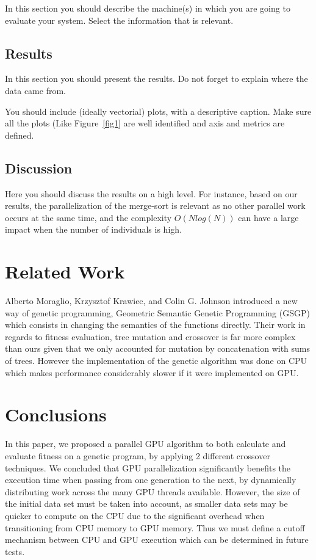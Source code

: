\documentclass[runningheads]{llncs}
\begin{document}
In this section you should describe the machine(s) in which you are going to evaluate your system. Select the information that is relevant.


\subsection{Results}

In this section you should present the results. Do not forget to explain where the data came from. 

You should include (ideally vectorial) plots, with a descriptive caption. Make sure all the plots (Like Figure~\ref{fig1} are well identified and axis and metrics are defined.

\subsection{Discussion}

Here you should discuss the results on a high level. For instance, based on our results, the parallelization of the merge-sort is relevant as no other parallel work occurs at the same time, and the complexity $O(Nlog(N))$ can have a large impact when the number of individuals is high.

\section{Related Work}

Alberto Moraglio, Krzysztof Krawiec, and Colin G. Johnson introduced a new way of genetic programming, Geometric Semantic Genetic Programming (GSGP) which consists in changing the semantics of the functions directly. Their work in regards to fitness evaluation, tree mutation and crossover is far more complex than ours given that we only accounted for mutation by concatenation with sums of trees. However the implementation of the genetic algorithm was done on CPU which makes performance considerably slower if it were implemented on GPU.


\section{Conclusions}

In this paper, we proposed a parallel GPU algorithm to both calculate and evaluate fitness on a genetic program, by applying 2 different crossover techniques. We concluded that GPU parallelization significantly benefits the execution time when passing from one generation to the next, by dynamically distributing work across the many GPU threads available. However, the size of the initial data set must be taken into account, as smaller data sets may be quicker to compute on the CPU due to the significant overhead when transitioning from CPU memory to GPU memory. Thus we must define a cutoff mechanism between CPU and GPU execution which can be determined in future tests.
\end{document}
